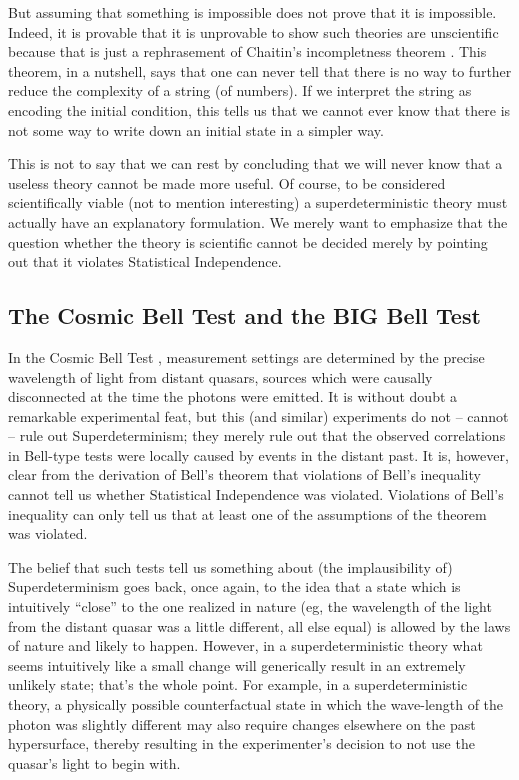 \documentclass[12pt]{article}
\begin{document}
But assuming that something is impossible does not prove that it is impossible. Indeed, it is provable that it is unprovable to show such theories are unscientific because that is just a rephrasement of Chaitin's incompletness theorem \cite{Chaitin}. This theorem, in a nutshell, says that one can never tell that there is no way to further reduce the complexity of a string (of numbers). If we interpret the string as encoding the initial condition, this tells us that we cannot ever know that there is not some way to write down an initial state in a simpler way. 

This is not to say that we can rest by concluding that we will never know that a useless theory cannot be made more useful. Of course, to be considered scientifically viable (not to mention interesting) a superdeterministic theory must actually have an explanatory formulation. We merely want to emphasize that the question whether the theory is scientific cannot be decided merely by pointing out that it violates Statistical Independence. 


\subsection{The Cosmic Bell Test and the BIG Bell Test}
\label{photon}

In the Cosmic Bell Test \cite{Handsteiner:2016ulx}, measurement settings are determined by the precise wavelength of light from distant quasars, sources which were causally disconnected at the time the photons were emitted. It is without doubt a remarkable experimental feat, but this (and similar) experiments do not -- cannot -- rule out Superdeterminism; they merely rule out that the observed correlations in Bell-type tests were locally caused by events in the distant past. It is, however, clear from the derivation of Bell's theorem that violations of Bell's inequality cannot tell us whether Statistical Independence was violated. Violations of Bell's inequality can only tell us that at least one of the assumptions of the theorem was violated.


The belief that such tests tell us something about (the implausibility of) Superdeterminism goes back, once again, to the idea that a state which is intuitively ``close'' to the one realized in nature  (eg, the wavelength of the light from the distant quasar was a little different, all else equal) is allowed by the laws of nature and likely to happen. However, in a superdeterministic theory what seems intuitively like a small change will generically result in an extremely unlikely state; that's the whole point. For example, in a superdeterministic theory, a physically possible counterfactual state in which the wave-length of the photon was slightly different may also require changes elsewhere on the past hypersurface, thereby resulting in the experimenter's decision to not use the quasar's light to begin with. 
\end{document}
